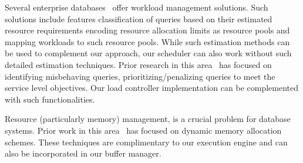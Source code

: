 
Several enterprise databases~\cite{res_gov, rm, DB2, teradatawm, gpdb, hpwm} offer
workload management solutions.
Such solutions include features %
classification of queries based on their estimated resource requirements %
encoding resource allocation limits as resource pools and mapping workloads to such resource pools. 
While such estimation methods can be used to complement our approach, 
our scheduler can also work without such detailed estimation techniques. 
Prior research in this area~\cite{krompass2007dynamic, krompass2006quality} has focused on identifying misbehaving queries, prioritizing/penalizing queries to meet the service level objectives.
Our load controller implementation can be complemented with such functionalities.


Resource (particularly memory) management, is a crucial problem for database systems. 
Prior work in this area~\cite{mehta1993dynamic, davison1995dynamic} has focused on dynamic memory allocation schemes.
These techniques are complimentary to our execution engine and can also be incorporated in our buffer manager. 

